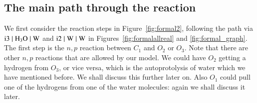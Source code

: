 \subsection{The main path through the reaction}
We first consider the reaction steps in Figure~\ref{fig:formal2}, following the path via 
$\mathrm{i3 \; \vert \; H_3O \; \vert \; W}$ and $\mathrm{i2 \; \vert \; W \; \vert \; W}$
in Figures~\ref{fig:formalallreal} and \ref{fig:formal_graph}. The first step is the $n,p$ 
reaction between $C_1$ and $O_2$ or $O_3$. 
Note that there are other $n,p$ reactions that are allowed by our model. 
%
We could have $O_2$ getting a hydrogen from $O_3$,
or vice versa, which is the autoprotolysis of water which we have mentioned before. 
We shall discuss this 
further later on. Also $O_1$ could pull one of the hydrogens from one of the water molecules:
again we shall discuss it later. 

